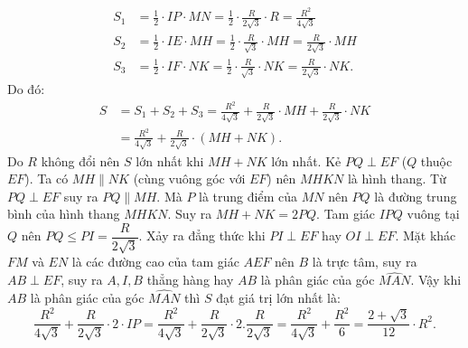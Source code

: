 \begin{ex}
{\begin{enumerate}
{    	\begin{align*}
    	{S_1} &= \frac{1}{2} \cdot IP \cdot MN = \frac{1}{2} \cdot \frac{R}{{2\sqrt 3 }} \cdot R = \frac{{{R^2}}}{{4\sqrt 3 }}\\
    	{S_2} &= \frac{1}{2} \cdot IE \cdot MH = \frac{1}{2} \cdot \frac{R}{{\sqrt 3 }} \cdot MH = \frac{R}{{2\sqrt 3 }} \cdot MH\\
    	{S_3} &= \frac{1}{2} \cdot IF \cdot NK = \frac{1}{2} \cdot \frac{R}{{\sqrt 3 }} \cdot NK = \frac{R}{{2\sqrt 3 }} \cdot NK.
    	\end{align*}}Do đó:
    {\allowdisplaybreaks
    	\begin{align*} 
    	S &= {S_1} + {S_2} + {S_3} =\frac{{{R^2}}}{{4\sqrt 3 }} + \frac{R}{{2\sqrt 3 }} \cdot MH + \frac{R}{{2\sqrt 3 }} \cdot NK\\
    	&= \frac{{{R^2}}}{{4\sqrt 3 }} + \frac{R}{{2\sqrt 3 }} \cdot \left( {MH + NK} \right).
    	\end{align*}}Do $R$ không đổi nên $S$ lớn nhất khi $MH + NK$ lớn nhất.
    Kẻ $PQ \perp EF$ ($Q$ thuộc $EF$).
    Ta có $MH \parallel NK$ (cùng vuông góc với $EF$) nên $MHKN$ là hình thang. Từ
    $PQ \perp EF$ suy ra $PQ \parallel MH$.
    Mà $P$ là trung điểm của $MN$ nên $PQ$ là đường trung bình của hình thang $MHKN$.
    Suy ra $MH + NK = 2PQ$.
    Tam giác $IPQ$ vuông tại $Q$ nên $PQ \le PI = \dfrac{R}{{2\sqrt 3 }}$.
    Xảy ra đẳng thức khi $PI \perp EF$ hay $OI \perp EF$.
    Mặt khác $FM$ và $EN$ là các đường cao của tam giác $AEF$ nên $B$ là trực tâm,
    suy ra $AB \perp EF$, suy ra
    $A,I,B$ thẳng hàng hay $AB$ là phân giác của góc $\widehat{MAN}$.
    Vậy khi $AB$ là phân giác của góc $\widehat{MAN}$ thì $S$ đạt giá trị lớn nhất là:         
    \[\frac{{{R^2}}}{{4\sqrt 3 }} + \frac{R}{{2\sqrt 3 }} \cdot 2 \cdot IP = \frac{{{R^2}}}{{4\sqrt 3 }} + \frac{R}{{2\sqrt 3 }} \cdot 2.\frac{R}{{2\sqrt 3 }} = \frac{{{R^2}}}{{4\sqrt 3 }} + \frac{{{R^2}}}{6} = \frac{{2 + \sqrt 3 }}{{12}} \cdot {R^2}.\]
\end{enumerate}
}
\end{ex}

